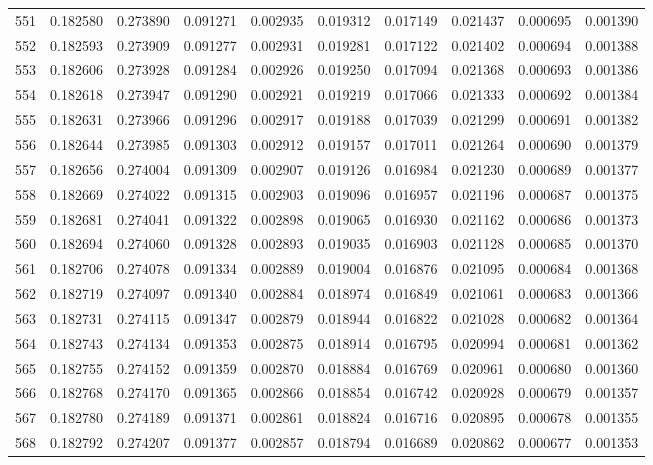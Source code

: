 \begin{tabular}{lrrrrrrrrr}
551 & 0.182580 & 0.273890 & 0.091271 & 0.002935 & 0.019312 & 0.017149 & 0.021437 & 0.000695 & 0.001390 \\
552 & 0.182593 & 0.273909 & 0.091277 & 0.002931 & 0.019281 & 0.017122 & 0.021402 & 0.000694 & 0.001388 \\
553 & 0.182606 & 0.273928 & 0.091284 & 0.002926 & 0.019250 & 0.017094 & 0.021368 & 0.000693 & 0.001386 \\
554 & 0.182618 & 0.273947 & 0.091290 & 0.002921 & 0.019219 & 0.017066 & 0.021333 & 0.000692 & 0.001384 \\
555 & 0.182631 & 0.273966 & 0.091296 & 0.002917 & 0.019188 & 0.017039 & 0.021299 & 0.000691 & 0.001382 \\
556 & 0.182644 & 0.273985 & 0.091303 & 0.002912 & 0.019157 & 0.017011 & 0.021264 & 0.000690 & 0.001379 \\
557 & 0.182656 & 0.274004 & 0.091309 & 0.002907 & 0.019126 & 0.016984 & 0.021230 & 0.000689 & 0.001377 \\
558 & 0.182669 & 0.274022 & 0.091315 & 0.002903 & 0.019096 & 0.016957 & 0.021196 & 0.000687 & 0.001375 \\
559 & 0.182681 & 0.274041 & 0.091322 & 0.002898 & 0.019065 & 0.016930 & 0.021162 & 0.000686 & 0.001373 \\
560 & 0.182694 & 0.274060 & 0.091328 & 0.002893 & 0.019035 & 0.016903 & 0.021128 & 0.000685 & 0.001370 \\
561 & 0.182706 & 0.274078 & 0.091334 & 0.002889 & 0.019004 & 0.016876 & 0.021095 & 0.000684 & 0.001368 \\
562 & 0.182719 & 0.274097 & 0.091340 & 0.002884 & 0.018974 & 0.016849 & 0.021061 & 0.000683 & 0.001366 \\
563 & 0.182731 & 0.274115 & 0.091347 & 0.002879 & 0.018944 & 0.016822 & 0.021028 & 0.000682 & 0.001364 \\
564 & 0.182743 & 0.274134 & 0.091353 & 0.002875 & 0.018914 & 0.016795 & 0.020994 & 0.000681 & 0.001362 \\
565 & 0.182755 & 0.274152 & 0.091359 & 0.002870 & 0.018884 & 0.016769 & 0.020961 & 0.000680 & 0.001360 \\
566 & 0.182768 & 0.274170 & 0.091365 & 0.002866 & 0.018854 & 0.016742 & 0.020928 & 0.000679 & 0.001357 \\
567 & 0.182780 & 0.274189 & 0.091371 & 0.002861 & 0.018824 & 0.016716 & 0.020895 & 0.000678 & 0.001355 \\
568 & 0.182792 & 0.274207 & 0.091377 & 0.002857 & 0.018794 & 0.016689 & 0.020862 & 0.000677 & 0.001353 \\

\end{tabular}
